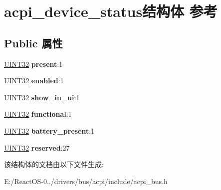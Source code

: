 \hypertarget{structacpi__device__status}{}\section{acpi\+\_\+device\+\_\+status结构体 参考}
\label{structacpi__device__status}
\subsection*{Public 属性}
\begin{DoxyCompactItemize}
\item 
\mbox{\label{structacpi__device__status_a97d90f14f906b4b3ef1d42b990d6f501}} 
\hyperlink{_processor_bind_8h_ae1e6edbbc26d6fbc71a90190d0266018}{U\+I\+N\+T32} {\bfseries present}\+:1
\item 
\mbox{\label{structacpi__device__status_a41a7ee5f8e8de1db7f89570311d60754}} 
\hyperlink{_processor_bind_8h_ae1e6edbbc26d6fbc71a90190d0266018}{U\+I\+N\+T32} {\bfseries enabled}\+:1
\item 
\mbox{\label{structacpi__device__status_a79cabffae08b78c45648181f8113909e}} 
\hyperlink{_processor_bind_8h_ae1e6edbbc26d6fbc71a90190d0266018}{U\+I\+N\+T32} {\bfseries show\+\_\+in\+\_\+ui}\+:1
\item 
\mbox{\label{structacpi__device__status_abee5521c6ed7b5f4ec1bfe4e04778dc2}} 
\hyperlink{_processor_bind_8h_ae1e6edbbc26d6fbc71a90190d0266018}{U\+I\+N\+T32} {\bfseries functional}\+:1
\item 
\mbox{\label{structacpi__device__status_a26d812d25f73bff2d25a41395d1ade0a}} 
\hyperlink{_processor_bind_8h_ae1e6edbbc26d6fbc71a90190d0266018}{U\+I\+N\+T32} {\bfseries battery\+\_\+present}\+:1
\item 
\mbox{\label{structacpi__device__status_a3c78b663756c8eab863594666690540f}} 
\hyperlink{_processor_bind_8h_ae1e6edbbc26d6fbc71a90190d0266018}{U\+I\+N\+T32} {\bfseries reserved}\+:27
\end{DoxyCompactItemize}


该结构体的文档由以下文件生成\+:\begin{DoxyCompactItemize}
\item 
E\+:/\+React\+O\+S-\/0../drivers/bus/acpi/include/acpi\+\_\+bus.\+h\end{DoxyCompactItemize}
